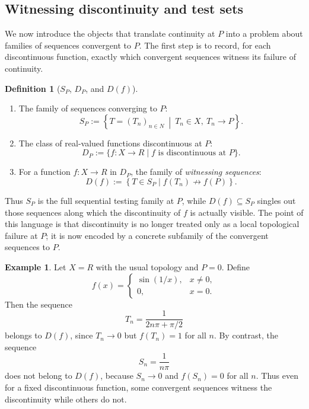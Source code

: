 \documentclass[11pt]{amsart}
\theoremstyle{plain}
\theoremstyle{definition}
\newtheorem{definition}[theorem]{Definition}
\newtheorem{example}[theorem]{Example}
\theoremstyle{remark}
\newcommand{\Sp}{\mathcal{S}_P}
\newcommand{\Dp}{\mathcal{D}_P}
\newcommand{\N}{\mathbb{N}}
\newcommand{\R}{\mathbb{R}}
\def\Sp{S_P}%
\def\Dp{D_P}%
\def\N{N}%
\def\R{R}%
\begin{document}
\subsection{Witnessing discontinuity and test sets}

We now introduce the objects that translate continuity at $P$ into a problem about families of sequences convergent to $P$.
The first step is to record, for each discontinuous function, exactly which convergent sequences witness its failure of continuity.

\begin{definition}[$\Sp$, $\Dp$, and $D(f)$]\label{def:SpDpDf}
\mbox{}
\begin{enumerate}[label=(\roman*)]
\item The family of sequences converging to $P$:
\[
\Sp:=\left\{T=(T_n)_{n\in\N}\ \middle|\ T_n\in X,\ T_n\to P\right\}.
\]

\item The class of real-valued functions discontinuous at $P$:
\[
\Dp:=\{f:X\to\R \mid f \text{ is discontinuous at } P\}.
\]

\item For a function $f:X\to\R$ in $\Dp$, the family of \emph{witnessing sequences}:
\[
D(f):=\left\{T\in\Sp \mid f(T_n)\not\to f(P)\right\}.
\]
\end{enumerate}
\end{definition}

Thus $\Sp$ is the full sequential testing family at $P$, while $D(f)\subseteq\Sp$ singles out those sequences along which the discontinuity of $f$ is actually visible.
The point of this language is that discontinuity is no longer treated only as a local topological failure at $P$;
it is now encoded by a concrete subfamily of the convergent sequences to $P$.

\begin{example}\label{ex:witnessing_in_R}
Let $X=\R$ with the usual topology and $P=0$.
Define
\[
f(x)=
\begin{cases}
\sin(1/x), & x\neq 0,\\
0, & x=0.
\end{cases}
\]
Then the sequence
\[
T_n=\frac{1}{2n\pi+\pi/2}
\]
belongs to $D(f)$, since $T_n\to 0$ but $f(T_n)=1$ for all $n$.
By contrast, the sequence
\[
S_n=\frac{1}{n\pi}
\]
does not belong to $D(f)$, because $S_n\to 0$ and $f(S_n)=0$ for all $n$.
Thus even for a fixed discontinuous function, some convergent sequences witness the discontinuity while others do not.
\end{example}
\end{document}
